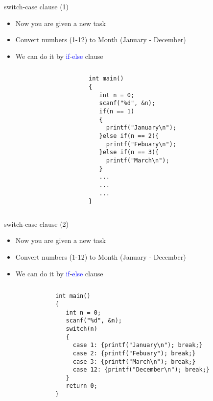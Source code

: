 \begin{frame}[fragile]{switch-case clause (1)}
\begin{itemize}
	\item {Now you are given a new task}
	\item {Convert numbers (1-12) to Month (January - December)}
	\item {We can do it by \textcolor{blue}{if}-\textcolor{blue}{else} clause}
\end{itemize}
\vspace{-0.1in}
\begin{columns}
\begin{column}{0.05\linewidth}
\end{column}
\begin{column}{0.6\linewidth}
\begin{lstlisting}[numbers=none, basicstyle=\footnotesize]
int main()
{
   int n = 0;
   scanf("%d", &n);
   if(n == 1)
   {
     printf("January\n");
   }else if(n == 2){
     printf("Febuary\n");
   }else if(n == 3){
     printf("March\n");
   }
   ...
   ...
   ...
}
\end{lstlisting}
\end{column}
\end{columns}
\end{frame}

\begin{frame}[fragile]{switch-case clause (2)}
\begin{itemize}
	\item {Now you are given a new task}
	\item {Convert numbers (1-12) to Month (January - December)}
	\item {We can do it by \textcolor{blue}{if}-\textcolor{blue}{else} clause}
\end{itemize}
\vspace{-0.1in}
\begin{columns}
\begin{column}{0.1\linewidth}
\end{column}
\begin{column}{0.8\linewidth}
\begin{lstlisting}[numbers=none, basicstyle=\footnotesize]
int main()
{
   int n = 0;
   scanf("%d", &n);
   switch(n)
   {
     case 1: {printf("January\n"); break;}
     case 2: {printf("Febuary"); break;}
     case 3: {printf("March\n"); break;}
     case 12: {printf("December\n"); break;}
   }
   return 0;
}
\end{lstlisting}
\end{column}
\end{columns}
\end{frame}

